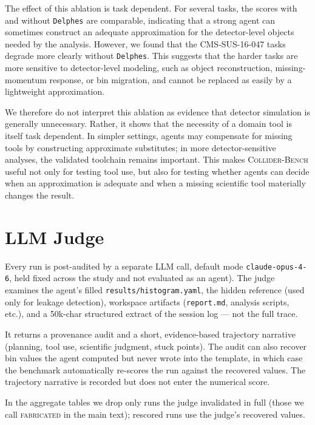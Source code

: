 \documentclass{article}
\newcommand{\ColliderBench}{\textsc{Collider-Bench}}
\begin{document}
The effect of this ablation is task dependent. For several tasks, the scores with and without \texttt{Delphes} are comparable, indicating that a strong agent can sometimes construct an adequate approximation for the detector-level objects needed by the analysis. However, we found that the CMS-SUS-16-047 tasks degrade more clearly without \texttt{Delphes}. This suggests that the harder tasks are more sensitive to detector-level modeling, such as object reconstruction, missing-momentum response, or bin migration, and cannot be replaced as easily by a lightweight approximation.

We therefore do not interpret this ablation as evidence that detector simulation is generally unnecessary. Rather, it shows that the necessity of a domain tool is itself task dependent. In simpler settings, agents may compensate for missing tools by constructing approximate substitutes; in more detector-sensitive analyses, the validated toolchain remains important. This makes \ColliderBench{} useful not only for testing tool use, but also for testing whether agents can decide when an approximation is adequate and when a missing scientific tool materially changes the result.

\section{LLM Judge}
\label{app:judge}

Every run is post-audited by a separate LLM call, default mode
\texttt{claude-opus-4-6}, held fixed across the study and not
evaluated as an agent). The judge examines the agent's filled
\texttt{results/histogram.yaml}, the hidden reference (used only for
leakage detection), workspace artifacts (\texttt{report.md},
analysis scripts, etc.), and a 50k-char structured extract of the
session log --- not the full trace.

It returns a provenance audit and a short, evidence-based
trajectory narrative (planning, tool use, scientific judgment,
stuck points). The audit can also recover bin values the agent
computed but never wrote into the template, in which case the
benchmark automatically re-scores the run against the recovered
values. The trajectory narrative is recorded but does not enter
the numerical score.

In the aggregate tables we drop only runs the judge invalidated
in full (those we call \textsc{fabricated} in the main text); rescored
runs use the judge's recovered values. 


%
\end{document}
